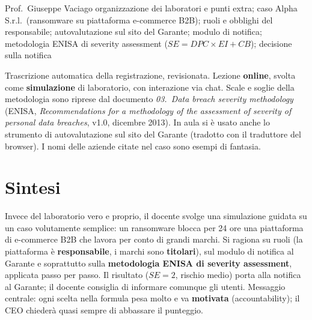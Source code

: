   {Prof.~Giuseppe Vaciago}
  {organizzazione dei laboratori e punti extra; caso Alpha S.r.l.\ (ransomware su piattaforma
   e-commerce B2B); ruoli e obblighi del responsabile; autovalutazione sul sito del Garante; modulo di
   notifica; metodologia ENISA di severity assessment ($SE = DPC \times EI + CB$); decisione sulla notifica}
\label{lez:2026-10-02}

\begin{nota}[Fonte]
Trascrizione automatica della registrazione, revisionata. Lezione \textbf{online}, svolta come
\textbf{simulazione} di laboratorio, con interazione via chat. Scale e soglie della metodologia sono
riprese dal documento \emph{03.~Data breach severity methodology} (ENISA, \emph{Recommendations for a
methodology of the assessment of severity of personal data breaches}, v1.0, dicembre 2013). In aula
si è usato anche lo strumento di autovalutazione sul sito del Garante (tradotto con il traduttore del
browser). I nomi delle aziende citate nel caso sono esempi di fantasia.
\end{nota}

\section{Sintesi}
Invece del laboratorio vero e proprio, il docente svolge una simulazione guidata su un caso
volutamente semplice: un ransomware blocca per 24 ore una piattaforma di e-commerce B2B che lavora per
conto di grandi marchi. Si ragiona su ruoli (la piattaforma è \textbf{responsabile}, i marchi sono
\textbf{titolari}), sul modulo di notifica al Garante e soprattutto sulla \textbf{metodologia ENISA di
severity assessment}, applicata passo per passo. Il risultato ($SE = 2$, rischio medio) porta alla
notifica al Garante; il docente consiglia di informare comunque gli utenti. Messaggio centrale: ogni
scelta nella formula pesa molto e va \textbf{motivata} (accountability); il CEO chiederà quasi sempre
di abbassare il punteggio.

